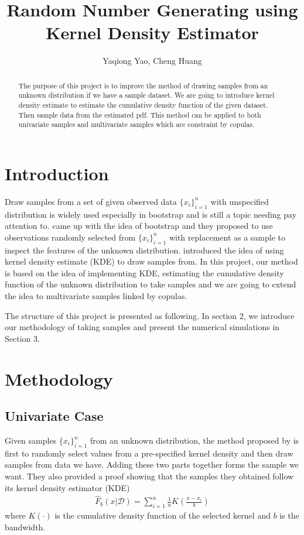 \documentclass[letterpaper,12pt,hidelinks]{article}
\begin{document}
\title{Random Number Generating using Kernel Density Estimator}
\author{Yaqiong Yao, Cheng Huang}
\maketitle



\begin{abstract}
The purpose of this project is to improve the method of drawing samples from an unknown distribution if we have a sample dataset. We are going to introduce kernel density estimate to estimate the cumulative density function of the given dataset. Then sample data from the estimated pdf. This method can be applied to both univariate samples and multivariate samples which are constraint by copulas. 
\end{abstract}

\section{Introduction}

Draw samples from a set of given observed data $\{x_i\}_{i=1}^n$ with unspecified distribution is widely used especially in bootstrap and is still a topic needing pay attention to. \cite{efron1979} came up with the idea of bootstrap and they proposed to use observations randomly selected from $\{x_i\}_{i=1}^n$ with replacement as a sample to inspect the features of the unknown distribution. \cite{kde} introduced the idea of using kernel density estimate (KDE) to draw samples from. In this project, our method is based on the idea of implementing KDE, estimating the cumulative density function of the unknown distribution to take samples and we are going to extend the idea to multivariate samples linked by copulas.

The structure of this project is presented as following. In section 2, we introduce our methodology of taking samples and present the numerical simulations in Section 3.

\section{Methodology}\label{sec:meth}

\subsection{Univariate Case}

Given samples $\{x_i\}_{i=1}^n$ from an unknown distribution, the method proposed by \cite{kde} is first to randomly select values from a pre-specified kernel density and then draw samples from data we have. Adding these two parts together forms the sample we want. They also provided a proof showing that the samples they obtained follow its kernel density estimator (KDE)
\begin{align}\label{eq:kde}
\hat{F}_b(x|\mathcal{D}) = \sum_{i=1}^n \frac{1}{n} K\left(\frac{x-x_i}{b}\right)
\end{align}
where $K(\cdot)$ is the cumulative density function of the selected kernel and $b$ is the bandwidth.
\end{document}
